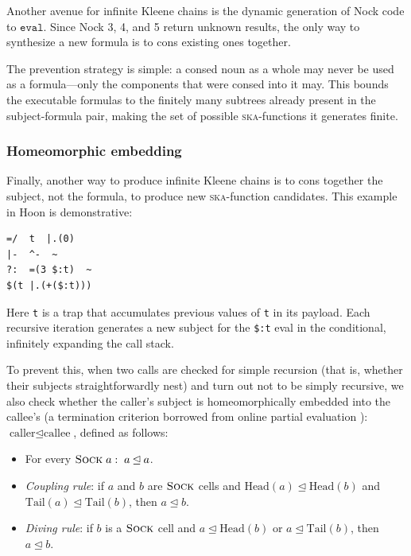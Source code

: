 \documentclass[twoside]{article}
\begin{document}
Another avenue for infinite Kleene chains is the dynamic generation of Nock code to $\mathtt{eval}$. Since Nock 3, 4, and 5 return unknown results, the only way to synthesize a new formula is to cons existing ones together.

The prevention strategy is simple: a consed noun as a whole may never be used as a formula---only the components that were consed into it may. This bounds the executable formulas to the finitely many subtrees already present in the subject-formula pair, making the set of possible \textsc{ska}-functions it generates finite.

\subsubsection{Homeomorphic embedding}

Finally, another way to produce infinite Kleene chains is to cons together the subject, not the formula, to produce new \textsc{ska}-function candidates. This example in Hoon is demonstrative:

\begin{lstlisting}[style=listingcode]
=/  t  |.(0)
|-  ^-  ~
?:  =(3 $:t)  ~
$(t |.(+($:t)))
\end{lstlisting}

Here \texttt{t} is a trap that accumulates previous values of \texttt{t} in its payload. Each recursive iteration generates a new subject for the \lstinline[style=inlinecode]{$:t} eval in the conditional, infinitely expanding the call stack.

To prevent this, when two calls are checked for simple recursion (that is, whether their subjects straightforwardly nest) and turn out not to be simply recursive, we also check whether the caller's subject is homeomorphically embedded into the callee's (a termination criterion borrowed from online partial evaluation \citep{leuschel-he}): $\text{caller} \unlhd \text{callee}$, defined as follows:
\begin{itemize}
  \item  For every $\textsc{Sock}\;a:\;a \unlhd a$.
  \item  \emph{Coupling rule}: if $a$ and $b$ are $\textsc{Sock}$ cells and $\text{Head}(a)\unlhd\text{Head}(b)$ and $\text{Tail}(a)\unlhd\text{Tail}(b)$, then $a \unlhd b$.
  \item  \emph{Diving rule}: if $b$ is a $\textsc{Sock}$ cell and $a \unlhd \text{Head}(b)$ or $a \unlhd \text{Tail}(b)$, then $a \unlhd b$.
\end{itemize}
\end{document}
